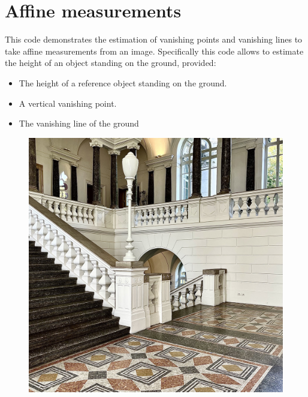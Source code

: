 \documentclass[12pt, a4paper]{report}
\begin{document}
    \section{Affine measurements}
    This code demonstrates the estimation of vanishing points and vanishing lines to take affine measurements from an image. Specifically this code allows to estimate the 
    height of an object standing on the ground, provided:
    \begin{itemize}
        \item The height of a reference object standing on the ground. 
        \item A vertical vanishing point. 
        \item The vanishing line of the ground
    \end{itemize}
    \begin{figure}[H]
        \centering
        \includegraphics[width=0.75\linewidth]{images/poli2.png}
    \end{figure}
\end{document}
